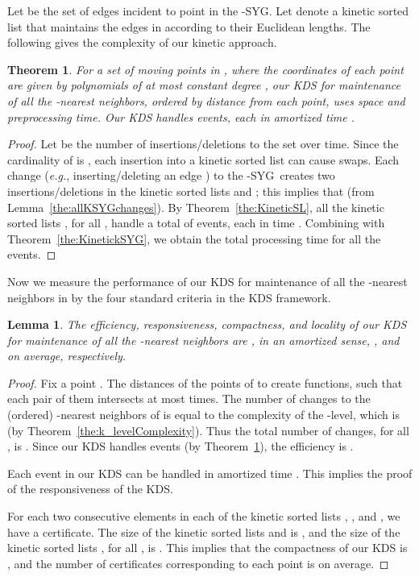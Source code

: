 \documentclass[preprint,12pt]{elsarticle}
\def\ksyg{\mbox{-SYG}}
\newcommand{\eg}{\emph{e.g.}}
\newtheorem{theorem}{Theorem}[section]
\newtheorem{lemma}{Lemma}[section]
\begin{document}
Let  be the set of edges incident to point  in the \ksyg. Let  denote a kinetic sorted list that maintains the edges in  according to their Euclidean lengths. The following gives the complexity of our kinetic approach.

\begin{theorem}\label{the:KinetickNNs}
For a set of  moving points in , where the coordinates of each point are given by polynomials of at most constant degree , our KDS for maintenance of all the -nearest neighbors, ordered by distance from each point, uses  space and  preprocessing time. Our KDS handles  events, each in  amortized time .
\end{theorem}
\begin{proof}
Let  be the number of insertions/deletions to the set  over time. Since the cardinality of  is , each insertion into a kinetic sorted list  can cause  swaps. Each change (\eg, inserting/deleting an edge ) to the \ksyg~creates two insertions/deletions in the kinetic sorted lists  and ; this implies that  (from Lemma~\ref{the:allKSYGchanges}). By Theorem~\ref{the:KineticSL}, all the kinetic sorted lists , for all , handle a total of   events, each in time . Combining with Theorem~\ref{the:KinetickSYG}, we obtain the total processing time  for all the events.
\end{proof}

Now we measure the performance of our KDS for maintenance of all the -nearest neighbors in  by the four standard criteria in the KDS framework.

\begin{lemma}\label{the:kNNsPerfCri}
The efficiency, responsiveness, compactness, and locality of our KDS for maintenance of all the -nearest neighbors are ,  in an amortized sense, , and  on average, respectively.
\end{lemma}
\begin{proof}
Fix a point . The distances of the points of  to  create  functions, such that each pair of them intersects at most  times. The number of changes to the (ordered) -nearest neighbors  of  is equal to the complexity of the -level, which is   (by Theorem~\ref{the:k_levelComplexity}). Thus the total number of changes, for all , is . Since our KDS  handles  events (by Theorem~\ref{the:KinetickNNs}), the efficiency is .

Each event in our KDS can be handled in amortized time . This implies the proof of the responsiveness of the KDS.



For each two consecutive elements in each of the kinetic sorted lists , , and , we have a certificate. The size of the kinetic sorted lists  and  is , and the size of the kinetic sorted lists , for all , is . This implies that the compactness of our KDS is , and the number of certificates corresponding to each point is  on average.
\end{proof}
\end{document}

